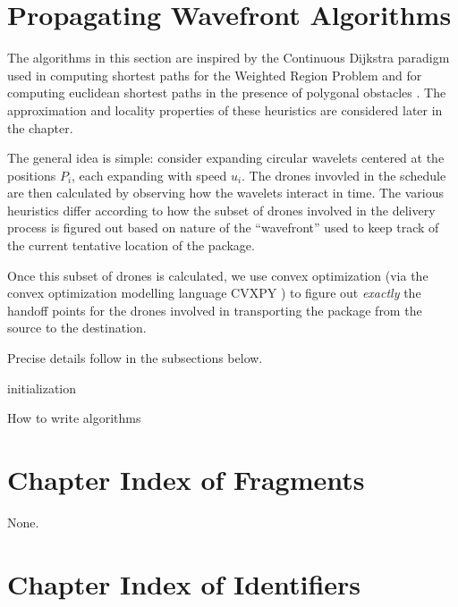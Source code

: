 \documentclass[12.0pt]{report}
\begin{document}
\section{Propagating Wavefront Algorithms}




The algorithms in this section are inspired by the Continuous Dijkstra paradigm used in computing shortest paths for the Weighted Region Problem
and for computing euclidean shortest paths in the presence of polygonal obstacles \cite{mitchell1991weighted, mitchell1996shortest}. 
The approximation and locality properties of these heuristics are considered later in the chapter. 




The general idea is simple: consider expanding circular wavelets centered at the positions $P_i$, each expanding with speed $u_i$. The drones invovled in the schedule
are then calculated by observing how the wavelets interact in time. The various heuristics differ according to how the subset of drones involved in the delivery 
process is figured out based on nature of the ``wavefront'' used to keep track of the current tentative location of the package. 

Once this subset of drones is calculated,  we use convex optimization (via the convex optimization modelling language CVXPY \cite{diamond2016cvxpy}) 
to figure out \textit{exactly} the handoff points for the drones involved in transporting the package from the source to the destination. 

Precise details follow in the subsections below.


\begin{algorithm}[H]
\SetAlgoLined
{}
      
initialization\;
\caption{How to write algorithms}
\end{algorithm}




\newpage
\section{Chapter Index of Fragments}
None.

\section{Chapter Index of Identifiers}
 






 



\begin{appendices}
\end{appendices}
\end{document}
